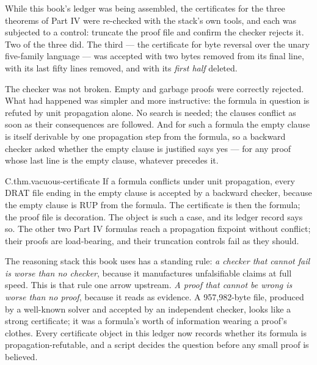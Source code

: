 While this book's ledger was being assembled, the certificates for the three theorems of Part IV were re-checked with the stack's own tools, and each was subjected to a control: truncate the proof file and confirm the checker rejects it. Two of the three did. The third --- the certificate for byte reversal over the unary five-family language --- was accepted with two bytes removed from its final line, with its last fifty lines removed, and with its \emph{first half} deleted.

The checker was not broken. Empty and garbage proofs were correctly rejected. What had happened was simpler and more instructive: the formula in question is refuted by unit propagation alone. No search is needed; the clauses conflict as soon as their consequences are followed. And for such a formula the empty clause is itself derivable by one propagation step from the formula, so a backward checker asked whether the empty clause is justified says yes --- for any proof whose last line is the empty clause, whatever precedes it.

\begin{artifact}{C.thm.vacuous-certificate}
If a formula conflicts under unit propagation, every DRAT file ending in the empty clause is accepted by a backward checker, because the empty clause is RUP from the formula. The certificate is then the formula; the proof file is decoration. The object  is such a case, and its ledger record says so. The other two Part IV formulas reach a propagation fixpoint without conflict; their proofs are load-bearing, and their truncation controls fail as they should.
\end{artifact}

\begin{keyidea}[title={The rule this generalizes}]
The reasoning stack this book uses has a standing rule: \emph{a checker that cannot fail is worse than no checker}, because it manufactures unfalsifiable claims at full speed. This is that rule one arrow upstream. \emph{A proof that cannot be wrong is worse than no proof}, because it reads as evidence. A 957,982-byte file, produced by a well-known solver and accepted by an independent checker, looks like a strong certificate; it was a formula's worth of information wearing a proof's clothes. Every certificate object in this ledger now records whether its formula is propagation-refutable, and a script decides the question before any small proof is believed.
\end{keyidea}


